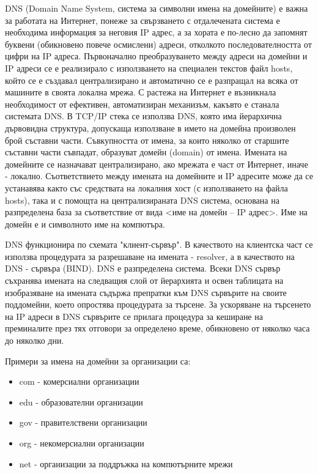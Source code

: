 \documentclass{article}
\begin{document}
DNS (Domain Name System, система за символни имена на домейните) е важна за работата на Интернет, понеже за свързването с
отдалечената система е необходима информация за неговия IP адрес, а за хората е по-лесно да запомнят буквени (обикновено
повече осмислени) адреси, отколкото последователността от цифри на IP адреса. Първоначално преобразуването между адреси на
домейни и IP адреси се е реализирало с използването на специален текстов файл hosts, който се е създавал централизирано и
автоматично се е разпращал на всяка от машините в своята локална мрежа. С растежа на Интернет е възникнала необходимост от
ефективен, автоматизиран механизъм, какъвто е станала системата DNS. 
В TCP/IP стека се използва DNS, която има йерархична дървовидна структура, допускаща използване в името на домейна произволен
брой съставни части. Съвкупността от имена, за които няколко от старшите съставни части съвпадат, образуват домейн (domain) от
имена. Имената на домейните се назначават централизирано, ако мрежата е част от Интернет, иначе - локално.
Съответствието между имената на домейните и IP адресите може да се устанавява както със средствата на локалния хост
(с използването на файла hosts), така и с помощта на централизираната DNS система, основана на разпределена база за съответствие
от вида <име на домейн – IP адрес>. Име на домейн е и символното име на компютъра.

DNS функционира по схемата "клиент-сървър". В качеството на клиентска част се използва процедурата за разрешаване на имената -
resolver, а в качеството на DNS - сървъра (BIND). DNS е разпределена система. Всеки DNS сървър съхранява имената на следващия
слой от йерархията и освен таблицата на изобразяване на имената съдържа препратки към DNS сървърите на своите поддомейни, което
опростява процедурата за търсене. За ускоряване на търсенето на IP адреси в DNS сървърите се прилага процедура за кеширане на
преминалите през тях отговори за определено време, обикновено от няколко часа до няколко дни.

Примери за имена на домейни за организации са:
\begin{itemize}
    \item com - комерсиални организации
    \item edu - образователни организации
    \item gov - правителствени организации
    \item org - некомерсиални организации
    \item net - организации за поддръжка на компютърните мрежи
\end{itemize}
\end{document}
